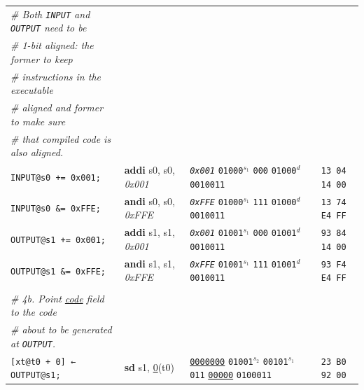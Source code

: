 \documentclass[a4paper,12pt,final]{article}
\begin{document}
\begin{table}[!htbp]
\begin{adjustwidth}{-1cm}{-1cm}
\begin{center}
\begin{tabular}{l|ll|l|l}
\hspace{1.053000em}​\emph{\# Both \texttt{INPUT} and \texttt{OUTPUT} need to be} &  &  &  & \\[0pt]
\hspace{1.053000em}​\emph{\# 1-bit aligned: the former to keep} &  &  &  & \\[0pt]
\hspace{1.053000em}​\emph{\# instructions in the executable} &  &  &  & \\[0pt]
\hspace{1.053000em}​\emph{\# aligned and former to make sure} &  &  &  & \\[0pt]
\hspace{1.053000em}​\emph{\# that compiled code is also aligned.} &  &  &  & \\[0pt]
\hspace{1.053000em}​\texttt{INPUT@s0 += 0x001;} & \textbf{addi} s0, s0, \emph{0x001} & \emph{\texttt{0x001}}                    \texttt{01000}​\(^{s_{1}}\) \texttt{000} \texttt{01000}​\(^{d}\)  \texttt{0010011} &  & \texttt{13 04 14 00}\\[0pt]
\hspace{1.053000em}​\texttt{INPUT@s0 \&= 0xFFE;} & \textbf{andi} s0, s0, \emph{0xFFE} & \emph{\texttt{0xFFE}}                    \texttt{01000}​\(^{s_{1}}\) \texttt{111} \texttt{01000}​\(^{d}\)  \texttt{0010011} &  & \texttt{13 74 E4 FF}\\[0pt]
\hspace{1.053000em}​\texttt{OUTPUT@s1 += 0x001;} & \textbf{addi} s1, s1, \emph{0x001} & \emph{\texttt{0x001}}                    \texttt{01001}​\(^{s_{1}}\) \texttt{000} \texttt{01001}​\(^{d}\)  \texttt{0010011} &  & \texttt{93 84 14 00}\\[0pt]
\hspace{1.053000em}​\texttt{OUTPUT@s1 \&= 0xFFE;} & \textbf{andi} s1, s1, \emph{0xFFE} & \emph{\texttt{0xFFE}}                    \texttt{01001}​\(^{s_{1}}\) \texttt{111} \texttt{01001}​\(^{d}\)  \texttt{0010011} &  & \texttt{93 F4 E4 FF}\\[0pt]
 &  &  &  & \\[0pt]
\hspace{1.053000em}​\emph{\# 4b. Point \uline{code} field to the code} &  &  &  & \\[0pt]
\hspace{1.053000em}​\emph{\# about to be generated at \texttt{OUTPUT}.} &  &  &  & \\[0pt]
\hspace{1.053000em}​\texttt{[xt@t0 + 0] ← OUTPUT@s1;} & \textbf{sd} s1, \uline{0}​(t0) & \uline{\texttt{0000000}} \texttt{01001}​\(^{s_{2}}\) \texttt{00101}​\(^{s_{1}}\) \texttt{011} \uline{\texttt{00000}} \texttt{0100011} &  & \texttt{23 B0 92 00}\\[0pt]

\end{tabular}
\end{center}
\end{adjustwidth}
\end{table}
\end{document}
